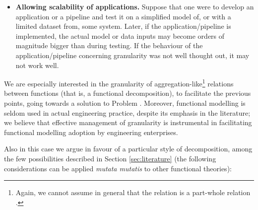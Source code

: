 \documentclass[
]{ceurart}
\begin{document}
\begin{itemize}
    \item \textbf{Allowing scalability of applications.} 
    Suppose that one were to develop an application or a pipeline and test it on a simplified model of, or with a limited dataset from, some system. Later, if the application/pipeline is implemented, the actual model or data inputs may become orders of magnitude bigger than during testing. If the behaviour of the application/pipeline concerning granularity was not well thought out, it may not work well.%
\end{itemize}

We are especially interested in the granularity of aggregation-like\footnote{Again, we cannot assume in general that the relation is a part-whole relation \cite{vermaasFormalImpossibilityAnalysing2013}.} relations between functions (that is, a functional decomposition), to facilitate the previous points, going towards a solution to Problem . Moreover, functional modelling is seldom used in actual engineering practice, despite its emphasis in the literature; we believe that effective management of granularity is instrumental in facilitating functional modelling adoption by engineering enterprises.

Also in this case we argue in favour of a particular style of decomposition, among the few possibilities described in Section \ref{sec:literature} (the following considerations can be applied \textit{mutata mutatis} to other functional theories):
\end{document}
